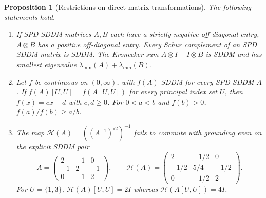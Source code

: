 \documentclass[11pt]{article}
\newtheorem{proposition}[theorem]{Proposition}
\begin{document}
\begin{proposition}[Restrictions on direct matrix transformations]
\label{prop:amplificationtransforms}
The following statements hold.
\begin{enumerate}
\item If SPD SDDM matrices $A,B$ each have a strictly negative
 off-diagonal entry, $A\otimes B$ has a positive off-diagonal entry.
 Every Schur complement of an SPD SDDM matrix is SDDM.
 The Kronecker sum $A\otimes I+I\otimes B$ is SDDM and has
 smallest eigenvalue $\lambda_{\min}(A)+\lambda_{\min}(B)$.
\item Let $f$ be continuous on $(0,\infty)$, with $f(A)$ SDDM
 for every SPD SDDM $A$. If
 $f(A)[U,U]=f(A[U,U])$ for every principal index set $U$, then
 $f(x)=cx+d$ with $c,d\geq0$. For $0<a<b$ and $f(b)>0$,
 $f(a)/f(b)\geq a/b$.
\item The map $\mathcal H(A)=((A^{-1})^{\circ2})^{-1}$ fails
 to commute with grounding even on the explicit SDDM pair
 \[
 A=\begin{pmatrix}2&-1&0\\-1&2&-1\\0&-1&2\end{pmatrix},\qquad
 \mathcal H(A)=\begin{pmatrix}2&-1/2&0\\-1/2&5/4&-1/2\\0&-1/2&2\end{pmatrix}.
 \]
 For $U=\{1,3\}$, $\mathcal H(A)[U,U]=2I$ whereas
 $\mathcal H(A[U,U])=4I$.
\end{enumerate}
\end{proposition}
\end{document}
